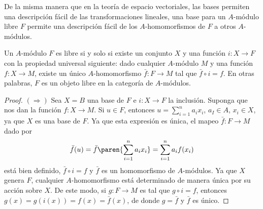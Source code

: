 De la misma manera que en la teoría de espacio vectoriales, las bases permiten una descripción fácil de las transformaciones lineales, una base para un $A$-módulo libre $F$ permite una descripción fácil de los $A$-homomorfismos de $F$ a otros $A$-módulos.

\begin{proposition}\label{prop:1.7.9}%
  Un $A$-módulo $F$ es libre si y solo si existe un conjunto $X$ y una función $i\colon X\to F$ con la propiedad universal siguiente: dado cualquier $A$-módulo $M$ y una función $f\colon X \to M$, existe un único $A$-homomorfismo $\bar f \colon F \to M$ tal que $\bar f \circ i = f$. En otras palabras, $F$ es un objeto libre en la categoría de $A$-módulos.
\end{proposition}
\begin{proof}
  $(\Rightarrow)$ Sea $X = B$ una base de $F$ e $i\colon X \to F$ la inclusión. Suponga que nos dan la función $f \colon X \to M$. Si $u\in F$, entonces $u = \sum_{i=1}^n a_ix_i$, $a_I \in A$, $x_i \in X$, ya que $X$ es una base de $F$. Ya que esta expresión es única, el mapeo $\bar f \colon F \to M$ dado por
  \[
    \bar f (u) = \bar f \paren{\sum_{i=1}^n a_ix_i} = \sum_{i=1}^n a_if(x_i)
  \]
  está bien definido, $\bar f \circ i = f$ y $\bar f$ es un homomorfismo de $A$-módulos. Ya que $X$ genera $F$, cualquier $A$-homomorfismo está determinado de manera única por su acción sobre $X$. De este modo, si $g \colon F \to M$ es tal que $g\circ i = f$, entonces $g(x) = g(i(x)) = f(x) = \bar f(x)$, de donde $g = \bar f$ y $\bar f$ es único.


\end{proof}
